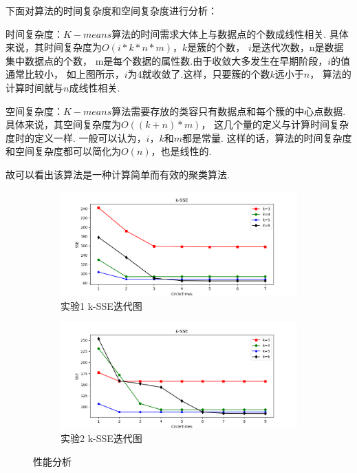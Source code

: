 \documentclass[bachelor,adobefonts]{jnuthesis}
\begin{document}
下面对算法的时间复杂度和空间复杂度进行分析：

时间复杂度：$K-means$算法的时间需求大体上与数据点的个数成线性相关.
具体来说，其时间复杂度为$O(i*k*n*m)$，$k$是簇的个数，
$i$是迭代次数，n是数据集中数据点的个数，
m是每个数据的属性数.由于收敛大多发生在早期阶段，$i$的值通常比较小，
如上图所示，$i$为4就收敛了.这样，只要簇的个数$k$远小于$n$，
算法的计算时间就与$n$成线性相关.

空间复杂度：$K-means$算法需要存放的类容只有数据点和每个簇的中心点数据.
具体来说，其空间复杂度为$O((k+n)*m)$，
这几个量的定义与计算时间复杂度时的定义一样.
一般可以认为，$i$，$k$和$m$都是常量.
这样的话，算法的时间复杂度和空间复杂度都可以简化为$O(n)$，也是线性的.

故可以看出该算法是一种计算简单而有效的聚类算法.

\begin{figure}[h!]
  \centering
  \begin{subfigure}[b]{0.8\linewidth}
    \includegraphics[width=\linewidth]{Wct-SSE-first.png}
    \caption{实验1 k-SSE迭代图}
  \end{subfigure}
  \begin{subfigure}[b]{0.8\linewidth}
    \includegraphics[width=\linewidth]{Wct-SSE-second.png}
    \caption{实验2 k-SSE迭代图}
  \end{subfigure}
  \caption{性能分析}
\end{figure}
\end{document}
